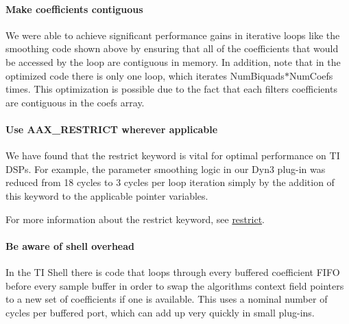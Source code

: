 \hypertarget{a00362_subsubsection__make_coefficients_contiguous_}{}\paragraph{Make coefficients contiguous}\label{a00362_subsubsection__make_coefficients_contiguous_}
 We were able to achieve significant performance gains in iterative loops like the smoothing code shown above by ensuring that all of the coefficients that would be accessed by the loop are contiguous in memory. In addition, note that in the optimized code there is only one loop, which iterates {\ttfamily Num\+Biquads$\ast$\+Num\+Coefs} times. This optimization is possible due to the fact that each filter\textquotesingle{}s coefficients are contiguous in the {\ttfamily coefs} array.

\hypertarget{a00362_subsubsection__use_aax_restrict_wherever_applicable_}{}\paragraph{Use A\+A\+X\+\_\+\+R\+E\+S\+T\+R\+I\+C\+T wherever applicable}\label{a00362_subsubsection__use_aax_restrict_wherever_applicable_}
 We have found that the {\ttfamily restrict} keyword is vital for optimal performance on T\+I D\+S\+Ps. For example, the parameter smoothing logic in our Dyn3 plug-\/in was reduced from 18 cycles to 3 cycles per loop iteration simply by the addition of this keyword to the applicable pointer variables.

For more information about the {\ttfamily restrict} keyword, see \hyperlink{a00362_subsubsection__restrict_}{restrict}.

\hypertarget{a00362_subsubsection__be_aware_of_shell_overhead_}{}\paragraph{Be aware of shell overhead}\label{a00362_subsubsection__be_aware_of_shell_overhead_}
 In the T\+I Shell there is code that loops through every buffered coefficient F\+I\+F\+O before every sample buffer in order to swap the algorithm\textquotesingle{}s context field pointers to a new set of coefficients if one is available. This uses a nominal number of cycles per buffered port, which can add up very quickly in small plug-\/ins.

